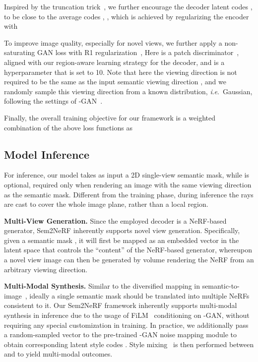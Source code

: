 \documentclass[runningheads]{llncs}
\newcommand{\ie}{\textit{i}.\textit{e}.}
\begin{document}
Inspired by the truncation trick~\cite{karras2019style,richardson2021encoding}, we further encourage the decoder latent codes ,  to be close to the average codes , , which is achieved by regularizing the encoder with


To improve image quality, especially for novel views, we further apply a non-saturating GAN loss with R1 regularization~\cite{mescheder2018training}, 
Here  is a patch discriminator~\cite{isola2017image}, aligned with our region-aware learning strategy for the decoder, and  is a hyperparameter that is set to 10. Note that here the viewing direction  is not required to be the same as the input semantic viewing direction , and we randomly sample this viewing direction from a known distribution, \ie~Gaussian, following the settings of -GAN~\cite{chan2021pi}.

Finally, the overall training objective for our framework is a weighted combination of the above loss functions as



\subsection{Model Inference}
For inference, our model takes as input a 2D single-view semantic mask, while  is optional, required only when rendering an image with the same viewing direction as the semantic mask. Different from the training phase, during inference the rays are cast to cover the whole image plane, rather than a local region. 

\noindent\textbf{Multi-View Generation.} 
Since the employed decoder is a NeRF-based generator, Sem2NeRF inherently supports novel view generation. Specifically, given a semantic mask , it will first be mapped as an embedded vector in the  latent space that controls the ``content'' of the NeRF-based generator, whereupon a novel view image can then be generated by volume rendering the NeRF from an arbitrary viewing direction.  

\noindent\textbf{Multi-Modal Synthesis.} Similar to the diversified mapping in semantic-to-image~\cite{park2019semantic}, ideally a single semantic mask should be translated into multiple NeRFs consistent to it. Our Sem2NeRF framework inherently supports multi-modal synthesis in inference due to the usage of FiLM~\cite{perez2018film} conditioning on -GAN, without requiring any special customization in training. In practice, we additionally pass a random-sampled vector to the pre-trained -GAN noise mapping module to obtain corresponding latent style codes . Style mixing~\cite{richardson2021encoding,karras2019style} is then performed between  and  to yield multi-modal outcomes.
\end{document}
